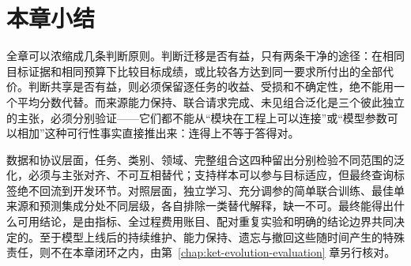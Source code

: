 \section{本章小结}
\label{sec:ket-evaluation-summary}

全章可以浓缩成几条判断原则。判断迁移是否有益，只有两条干净的途径：在相同目标证据和相同预算下比较目标成绩，或比较各方达到同一要求所付出的全部代价。判断共享是否有益，则必须保留逐任务的收益、受损和不确定性，绝不能用一个平均分数代替。而来源能力保持、联合请求完成、未见组合泛化是三个彼此独立的主张，必须分别验证——它们都不能从“模块在工程上可以连接”或“模型参数可以相加”这种可行性事实直接推出来：连得上不等于答得对。

数据和协议层面，任务、类别、领域、完整组合这四种留出分别检验不同范围的泛化，必须与主张对齐、不可互相替代；支持样本可以参与目标适应，但最终查询标签绝不回流到开发环节。对照层面，独立学习、充分调参的简单联合训练、最佳单来源和预测集成分处不同层级，各自排除一类替代解释，缺一不可。最终能得出什么可用结论，是由指标、全过程费用账目、配对重复实验和明确的结论边界共同决定的。至于模型上线后的持续维护、能力保持、遗忘与撤回这些随时间产生的特殊责任，则不在本章闭环之内，由第~\ref{chap:ket-evolution-evaluation} 章另行核对。
